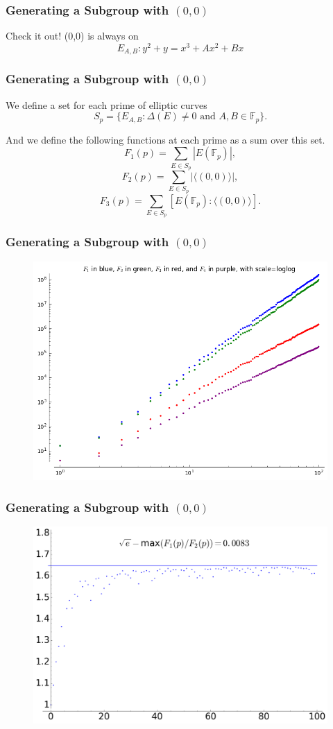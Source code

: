 \documentclass{beamer}
\newcommand{\F}{\mathbb{F}}
\begin{document}
\begin{frame}
\frametitle{Generating a Subgroup with $(0,0)$}
Check it out! (0,0) is always on 
\[ E_{A,B} \colon y^2 + y = x^3 + Ax^2 + Bx \]
\end{frame}

\begin{frame}
\frametitle{Generating a Subgroup with $(0,0)$}
We define a set for each prime of elliptic 
curves 
\[ S_p = \{ E_{A,B} \colon \Delta(E) \neq 0 \text{ and } A,B \in \F_p \}. \]

And we define the following functions at each 
prime as a sum over this set. 
\[ F_1(p) = \displaystyle\sum_{E \in S_p} |E(\F_p)|, \]
\[ F_2(p) = \displaystyle\sum_{E \in S_p} |\langle (0,0) \rangle|, \]
\[ F_3(p) = \displaystyle\sum_{E \in S_p} [E(\F_p) : \langle (0,0) \rangle]. \]
\end{frame}

\begin{frame}
\frametitle{Generating a Subgroup with $(0,0)$}
\begin{figure}[H]
\centering
\includegraphics[width=.8\textwidth]{f_family}
\end{figure}
\end{frame}

\begin{frame}
\frametitle{Generating a Subgroup with $(0,0)$}
\begin{figure}[H]
\centering
\includegraphics[width=.9\textwidth]{f1_div_f2}
\end{figure}
\end{frame}
\end{document}

